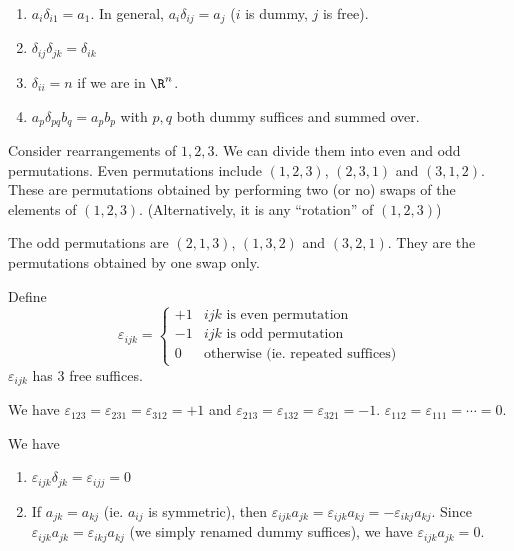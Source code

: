 \documentclass[a4paper]{article}
\begin{document}
\begin{eg}\leavevmode
  \begin{enumerate}
    \item $a_i\delta_{i1} = a_1$. In general, $a_i\delta_{ij} = a_j$ ($i$ is dummy, $j$ is free).
    \item $\delta_{ij}\delta_{jk} = \delta_{ik}$
    \item $\delta_{ii} = n$ if we are in $\R^n$.
    \item $a_p\delta_{pq}b_q = a_pb_p$ with $p, q$ both dummy suffices and summed over.
  \end{enumerate}
\end{eg}

\begin{defi}
  Consider rearrangements of $1, 2, 3$. We can divide them into even and odd permutations. Even permutations include $(1, 2, 3)$, $(2, 3, 1)$ and $(3, 1, 2)$. These are permutations obtained by performing two (or no) swaps of the elements of $(1, 2, 3)$. (Alternatively, it is any ``rotation'' of $(1, 2, 3)$)

  The odd permutations are $(2, 1, 3)$, $(1, 3, 2)$ and $(3, 2, 1)$. They are the permutations obtained by one swap only.

  Define
  \[
    \varepsilon_{ijk} =
    \begin{cases}
      +1 & ijk \text{ is even permutation}\\
      -1 & ijk\text{ is odd permutation}\\
      0 & \text{otherwise (ie. repeated suffices)}
    \end{cases}
  \]
  $\varepsilon_{ijk}$ has 3 free suffices.

  We have $\varepsilon_{123} = \varepsilon_{231} = \varepsilon_{312} = +1$ and $\varepsilon_{213} = \varepsilon_{132} = \varepsilon_{321} = -1$. $\varepsilon_{112} = \varepsilon_{111} = \cdots = 0$.
\end{defi}

We have
\begin{enumerate}
  \item $\varepsilon_{ijk}\delta_{jk} = \varepsilon_{ijj} = 0$
  \item If $a_{jk} = a_{kj}$ (ie. $a_{ij}$ is symmetric), then $\varepsilon_{ijk}a_{jk} = \varepsilon_{ijk}a_{kj} = -\varepsilon_{ikj}a_{kj}$. Since $\varepsilon_{ijk}a_{jk} = \varepsilon_{ikj}a_{kj}$ (we simply renamed dummy suffices), we have $\varepsilon_{ijk}a_{jk} = 0$.
\end{enumerate}
\end{document}
